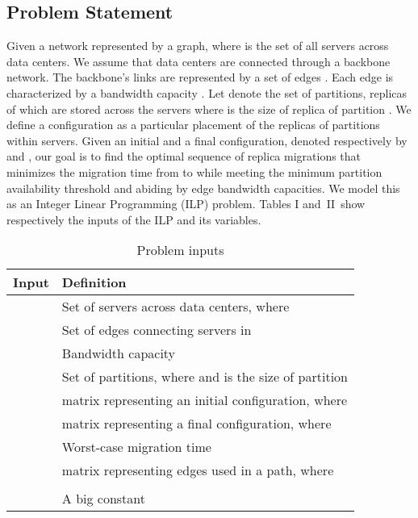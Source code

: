 \subsection{Problem Statement}
Given a network represented by a graph, where  is the set of all servers across data centers. We assume that data centers are connected through a backbone network. The backbone's links are represented by a set of edges   . Each edge  is characterized by a bandwidth capacity . Let  denote the set of partitions, replicas of which are stored across the servers where   is the size of replica of partition . We define a configuration as a particular placement of the replicas of partitions within servers. Given an initial and a final configuration, denoted respectively by  and , our goal is to find the optimal sequence of replica migrations that minimizes the migration time from  to   while meeting the minimum partition availability threshold  and abiding by edge bandwidth capacities. We model this as an Integer Linear Programming (ILP) problem.
Tables I and~II~show respectively the inputs of the ILP and its variables.
\begin{table} [!htb]
\caption{Problem inputs}
\begin{tabular}{|m{23pt}|m{208pt}|} 
\hline
	\textbf{Input}
 	& 
	\textbf{Definition}
 \\
\hline
	
 	& 
 	Set of servers across data centers, where 
\\ 
 
\hline
	
 	& 
 	Set of edges connecting servers in 
\\

\hline
	
	& 
	Bandwidth capacity 
\\

\hline
 	
	& 
	Set of partitions, where  and  is the size of partition  
 \\

\hline
	
	& 
	 matrix representing an initial configuration, where
	

\\

\hline
	
	&
	 matrix representing a final configuration, where 
\\

\hline
	
 	&  
	Worst-case migration time
 \\

\hline
	
	&
	 matrix representing edges used in a path,  where \\ & 

 \\

\hline

&  
A big constant 
 \\
\hline
\end{tabular}
 \end{table}




